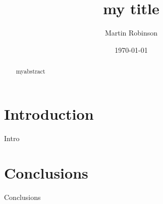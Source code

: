 \documentclass[a4paper,]{article}
\begin{document}
\title{my title}

\author{Martin Robinson}

\date{\today}

\maketitle

\begin{abstract}
myabstract
\end{abstract}

\section{Introduction}\label{sec:intro}

Intro 

\section{Conclusions}\label{conclusions}

Conclusions



\end{document}
